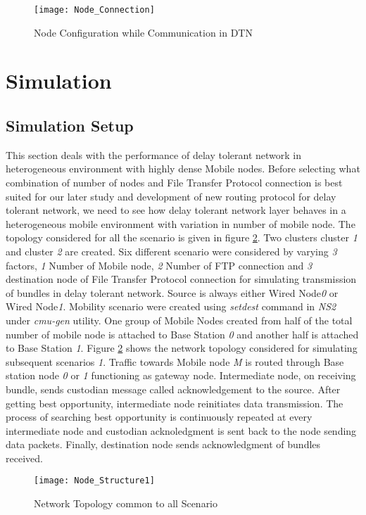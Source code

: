 \documentclass[3p,times]{elsarticle}
\begin{document}
\begin{figure}[h]
\centering
\mbox{\texttt{[image: Node\_Connection]}}
\caption{Node Configuration while Communication in DTN}
\label{f3}
\end{figure}

\section{Simulation} \label{sim}
\subsection{Simulation Setup} \label{simsetup}
This section deals with the performance of delay tolerant network in heterogeneous environment with highly dense Mobile nodes. Before selecting what combination of number of nodes and File Transfer Protocol connection is best suited for our later study and development of new routing protocol for delay tolerant network, we need to see how delay tolerant network layer behaves in a heterogeneous mobile environment with variation in number of mobile node. The topology considered for all the scenario is given in figure \ref{f4}. Two clusters cluster \emph{1} and cluster \emph{2} are created. Six different scenario were considered by varying \emph{3} factors, \emph{1} Number of Mobile node, \emph {2} Number of FTP connection and \emph{3} destination node of File Transfer Protocol connection for simulating transmission of bundles in delay tolerant network. Source is always either Wired Node\emph{0} or Wired Node\emph{1}. Mobility scenario were created using \emph{setdest} command in \emph{NS2} under \emph{cmu-gen} utility. One group of Mobile Nodes created from half of the total number of mobile node is attached to Base Station \emph{0} and another half is attached to Base Station \emph{1}. Figure \ref{f4} shows the network topology considered for simulating subsequent scenarios \emph{1}. Traffic towards Mobile node \emph{M} is routed through Base station node \emph{0} or \emph{1} functioning as gateway node. Intermediate node, on receiving bundle, sends custodian message called acknowledgement to the source. After getting best opportunity, intermediate node reinitiates data transmission. The process of searching best opportunity is continuously repeated at every intermediate node and custodian acknoledgment is sent back to the node sending data packets. Finally, destination node sends acknowledgment of bundles received. 
\begin{figure}[h]
\centering
\mbox{\texttt{[image: Node\_Structure1]}}
\caption{Network Topology common to all Scenario}
\label{f4}
\end{figure}
\end{document}
